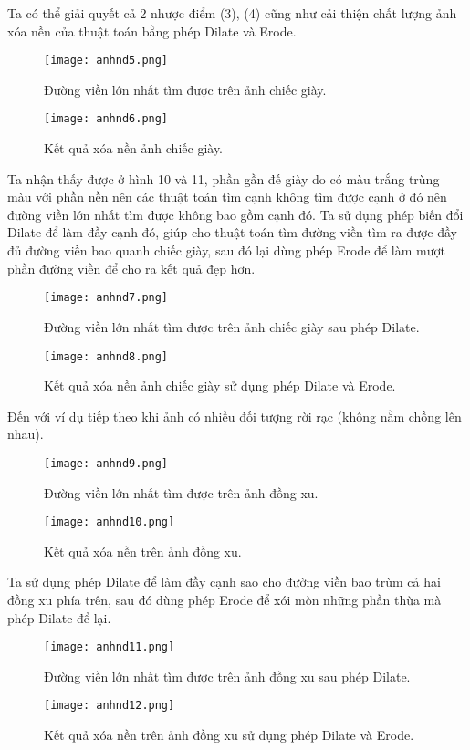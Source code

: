 \documentclass[conference]{IEEEtran}
\begin{document}
 Ta có thể giải quyết cả 2 nhược điểm (3), (4) cũng như cải thiện chất lượng ảnh xóa nền của thuật toán bằng phép Dilate và Erode.
  \begin{figure}[!htb]
\centerline{\texttt{[image: anhnd5.png]}}
\caption{Đường viền lớn nhất tìm được trên ảnh chiếc giày.}
\label{fig}
\end{figure}
 \FloatBarrier
   \begin{figure}[!htb]
\centerline{\texttt{[image: anhnd6.png]}}
\caption{Kết quả xóa nền ảnh chiếc giày.}
\label{fig}
\end{figure}
 \FloatBarrier
Ta nhận thấy được ở hình 10 và 11, phần gần đế giày do có màu trắng trùng màu với phần nền nên các thuật toán tìm cạnh không tìm được cạnh ở đó nên đường viền lớn nhất tìm được không bao gồm cạnh đó. Ta sử dụng phép biến đổi Dilate để làm đầy cạnh đó, giúp cho thuật toán tìm đường viền tìm ra được đầy đủ đường viền bao quanh chiếc giày, sau đó lại dùng phép Erode để làm mượt phần đường viền để cho ra kết quả đẹp hơn.

 \begin{figure}[!htb]
\centerline{\texttt{[image: anhnd7.png]}}
\caption{Đường viền lớn nhất tìm được trên ảnh chiếc giày sau phép Dilate.}
\label{fig}
\end{figure}
 \FloatBarrier
   \begin{figure}[!htb]
\centerline{\texttt{[image: anhnd8.png]}}
\caption{Kết quả xóa nền ảnh chiếc giày sử dụng phép Dilate và Erode.}
\label{fig}
\end{figure}
 \FloatBarrier
 Đến với ví dụ tiếp theo khi ảnh có nhiều đối tượng rời rạc (không nằm chồng lên nhau).
 \begin{figure}[!htb]
\centerline{\texttt{[image: anhnd9.png]}}
\caption{Đường viền lớn nhất tìm được trên ảnh đồng xu.}
\label{fig}
\end{figure}
 \FloatBarrier
  \begin{figure}[!htb]
\centerline{\texttt{[image: anhnd10.png]}}
\caption{Kết quả xóa nền trên ảnh đồng xu.}
\label{fig}
\end{figure}
 \FloatBarrier
 Ta sử dụng phép Dilate để làm đầy cạnh sao cho đường viền bao trùm cả hai đồng xu phía trên, sau đó dùng phép Erode để xói mòn những phần thừa mà phép Dilate để lại.
 \begin{figure}[!htb]
\centerline{\texttt{[image: anhnd11.png]}}
\caption{Đường viền lớn nhất tìm được trên ảnh đồng xu sau phép Dilate.}
\label{fig}
\end{figure}
 \FloatBarrier
  \begin{figure}[!htb]
\centerline{\texttt{[image: anhnd12.png]}}
\caption{Kết quả xóa nền trên ảnh đồng xu sử dụng phép Dilate và Erode.}
\label{fig}
\end{figure}
 \FloatBarrier
\end{document}
